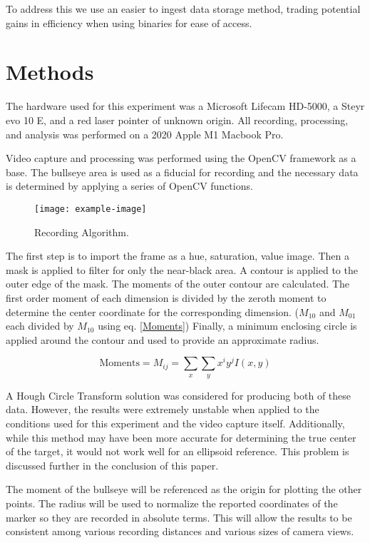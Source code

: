 \documentclass[conference]{IEEEtran}
\begin{document}
To address this we use an easier to ingest data storage method, trading potential gains in efficiency when using binaries for ease of access.

\section{Methods}

The hardware used for this experiment was 
a Microsoft Lifecam HD-5000,
a Steyr evo 10 E,
and a red laser pointer of unknown origin.
All recording, processing, and analysis was performed on 
a 2020 Apple M1 Macbook Pro.

Video capture and processing was performed using the 
OpenCV \cite{itseez2015opencv} framework as a base.
The bullseye area is used as a fiducial for recording and 
the necessary data is determined by applying a series of OpenCV functions.

\begin{figure}[h]
	\centering
	\texttt{[image: example-image]}
	\caption{Recording Algorithm.}
	\label{fig:capture_algorithm}
\end{figure}

The first step is to import the frame as a hue, saturation, value image.
Then a mask is applied to filter for only the near-black area.
A contour is applied to the outer edge of the mask.
The moments of the outer contour are calculated.
The first order moment of each dimension is divided by the zeroth moment to determine the center coordinate for the corresponding dimension.
($M_{10}$ and $M_{01}$ each divided by $M_{10}$ using eq. \eqref{Moments})
Finally, a minimum enclosing circle is applied around the contour and used to provide an approximate radius.

\begin{equation}\label{Moments}
	\text{Moments} = M_{ij} = \sum_{x} \sum_{y} x^i y^j I(x,y)
\end{equation}

A Hough Circle Transform solution \cite{Hough1964} was considered for producing both of these data.
However, the results were extremely unstable when applied to the conditions used for this experiment and the video capture itself.
Additionally, while this method may have been more accurate for determining the true center of the target, it would not work well for an ellipsoid reference.
This problem is discussed further in the conclusion of this paper.

The moment of the bullseye will be referenced as the origin for plotting the other points. 
The radius will be used to normalize the reported coordinates of the marker so they are recorded in absolute terms.
This will allow the results to be consistent among various recording distances and various sizes of camera views.
\end{document}
